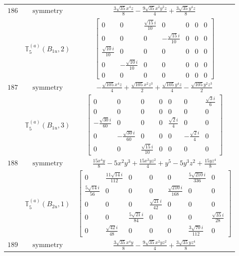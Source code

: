 \documentclass[fleqn,8pt,landscape]{jsarticle}
\begin{document}
\begin{longtable}{ccc}
$ 186 $ & $ \text{symmetry} $ & $ \frac{3 \sqrt{35} x^{4} z}{8} - \frac{9 \sqrt{35} x^{2} y^{2} z}{4} + \frac{3 \sqrt{35} y^{4} z}{8} $ \\
$  $ & $ \mathbb{T}_{5}^{(a)}(B_{1u},2) $ & $ \begin{bmatrix} 0 & 0 & \frac{\sqrt{15} i}{10} & 0 & 0 & 0 & 0 \\ 0 & 0 & 0 & - \frac{\sqrt{15} i}{10} & 0 & 0 & 0 \\ \frac{\sqrt{10} i}{10} & 0 & 0 & 0 & 0 & 0 & 0 \\ 0 & - \frac{\sqrt{10} i}{10} & 0 & 0 & 0 & 0 & 0 \\ 0 & 0 & 0 & 0 & 0 & 0 & 0 \end{bmatrix} $ \\ \hline
$ 187 $ & $ \text{symmetry} $ & $ - \frac{\sqrt{105} x^{4} z}{4} + \frac{\sqrt{105} x^{2} z^{3}}{2} + \frac{\sqrt{105} y^{4} z}{4} - \frac{\sqrt{105} y^{2} z^{3}}{2} $ \\
$  $ & $ \mathbb{T}_{5}^{(a)}(B_{1u},3) $ & $ \begin{bmatrix} 0 & 0 & 0 & 0 & 0 & 0 & \frac{\sqrt{3} i}{6} \\ 0 & 0 & 0 & 0 & 0 & 0 & 0 \\ - \frac{\sqrt{30} i}{60} & 0 & 0 & 0 & \frac{\sqrt{2} i}{4} & 0 & 0 \\ 0 & - \frac{\sqrt{30} i}{60} & 0 & 0 & 0 & - \frac{\sqrt{2} i}{4} & 0 \\ 0 & 0 & \frac{\sqrt{15} i}{10} & 0 & 0 & 0 & 0 \end{bmatrix} $ \\ \hline
$ 188 $ & $ \text{symmetry} $ & $ \frac{15 x^{4} y}{8} - 5 x^{2} y^{3} + \frac{15 x^{2} y z^{2}}{4} + y^{5} - 5 y^{3} z^{2} + \frac{15 y z^{4}}{8} $ \\
$  $ & $ \mathbb{T}_{5}^{(a)}(B_{2u},1) $ & $ \begin{bmatrix} 0 & \frac{11 \sqrt{14} i}{112} & 0 & 0 & 0 & \frac{5 \sqrt{210} i}{336} & 0 \\ \frac{5 \sqrt{14} i}{56} & 0 & 0 & 0 & \frac{\sqrt{210} i}{168} & 0 & 0 \\ 0 & 0 & 0 & \frac{\sqrt{21} i}{42} & 0 & 0 & 0 \\ 0 & 0 & \frac{5 \sqrt{21} i}{84} & 0 & 0 & 0 & \frac{\sqrt{35} i}{28} \\ 0 & \frac{\sqrt{42} i}{48} & 0 & 0 & 0 & \frac{3 \sqrt{70} i}{112} & 0 \end{bmatrix} $ \\ \hline
$ 189 $ & $ \text{symmetry} $ & $ \frac{3 \sqrt{35} x^{4} y}{8} - \frac{9 \sqrt{35} x^{2} y z^{2}}{4} + \frac{3 \sqrt{35} y z^{4}}{8} $ \\

\end{longtable}
\end{document}

